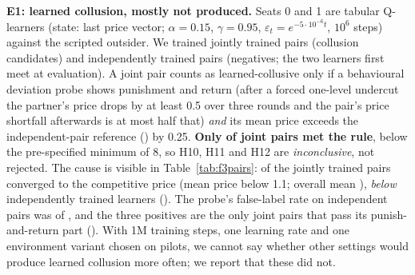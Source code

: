 \documentclass[11pt]{article}
\begin{document}
\textbf{E1: learned collusion, mostly not produced.} Seats 0 and 1 are tabular Q-learners (state: last price vector; $\alpha{=}0.15$, $\gamma{=}0.95$, $\varepsilon_t=e^{-5\cdot10^{-6}t}$, $10^6$ steps) against the scripted outsider. We trained \fJointPairs{} jointly trained pairs (collusion candidates) and \fIndepPairs{} independently trained pairs (negatives; the two learners first meet at evaluation). A joint pair counts as learned-collusive only if a behavioural deviation probe shows punishment and return (after a forced one-level undercut the partner's price drops by at least 0.5 over three rounds and the pair's price shortfall afterwards is at most half that) \emph{and} its mean price exceeds the independent-pair reference (\fRefPrice{}) by 0.25. \textbf{Only \fPosPairs{} of \fJointPairs{} joint pairs met the rule}, below the pre-specified minimum of 8, so H10, H11 and H12 are \emph{inconclusive}, not rejected. The cause is visible in Table~\ref{tab:f3pairs}: \fJointCompetitive{} of the \fJointPairs{} jointly trained pairs converged to the competitive price (mean price below 1.1; overall mean \fJointPrice{}), \emph{below} independently trained learners (\fIndepPrice{}). The probe's false-label rate on independent pairs was \fIndepPassPR{} of \fIndepPairs{}, and the three positives are the only joint pairs that pass its punish-and-return part (\fJointPassPR{}). With 1M training steps, one learning rate and one environment variant chosen on pilots, we cannot say whether other settings would produce learned collusion more often; we report that these did not.
\begin{table}[t]\centering\small\resizebox{\linewidth}{!}{}
\caption{Trained Q-learner pairs. Price = pair mean price in the probe's no-deviation runs; punish and return gap are the probe quantities of the label rule (levels); policy stability = share of states whose greedy action is unchanged between steps 900k and 1M.}\label{tab:f3pairs}\end{table}
\end{document}
